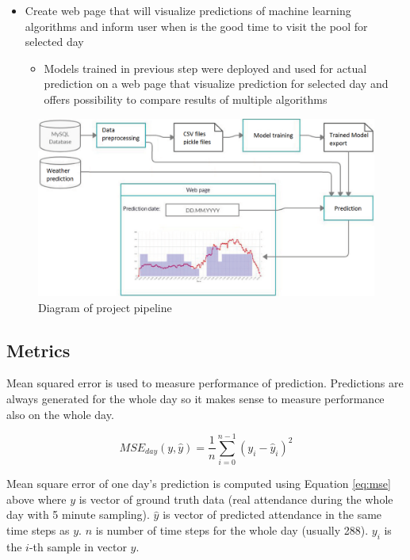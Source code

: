 \documentclass{article}
\begin{document}
\begin{itemize}
\item Create web page that will visualize predictions of machine learning algorithms and inform user when is the good time to visit the pool for selected day
\begin{itemize}
\item Models trained in previous step were deployed and used for actual prediction on a web page that visualize prediction for selected day and offers possibility to compare results of multiple algorithms
\end{itemize}
\end{itemize}

\begin{figure}[h!]
\centering
\includegraphics[width=12cm]{imgs/project_pipeline}
\caption{Diagram of project pipeline}
\label{fig:diagram_pipeline}
\end{figure}

\subsection{Metrics}
Mean squared error is used to measure performance of prediction. Predictions are always generated for the whole day so it makes sense to measure performance also on the whole day. 

\begin{equation}
\label{eq:mse}
MSE_{day}(y,\hat{y}) = \dfrac{1}{n} \sum^{n-1}_{i=0}(y_i-\hat{y}_i)^2
\end{equation}

Mean square error of one day's prediction is computed using Equation \ref{eq:mse} above where $y$ is vector of ground truth data (real attendance during the whole day with 5 minute sampling). $\hat{y}$ is vector of predicted attendance in the same time steps as $y$. $n$ is number of time steps for the whole day (usually 288). $y_i$ is the $i$-th sample in vector $y$. 
\end{document}
